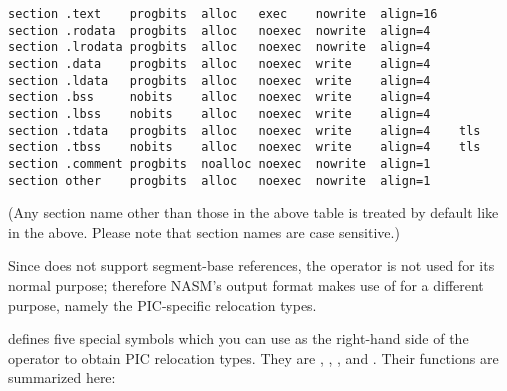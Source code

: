 \begin{lstlisting}
section .text    progbits  alloc   exec    nowrite  align=16
section .rodata  progbits  alloc   noexec  nowrite  align=4
section .lrodata progbits  alloc   noexec  nowrite  align=4
section .data    progbits  alloc   noexec  write    align=4
section .ldata   progbits  alloc   noexec  write    align=4
section .bss     nobits    alloc   noexec  write    align=4
section .lbss    nobits    alloc   noexec  write    align=4
section .tdata   progbits  alloc   noexec  write    align=4    tls
section .tbss    nobits    alloc   noexec  write    align=4    tls
section .comment progbits  noalloc noexec  nowrite  align=1
section other    progbits  alloc   noexec  nowrite  align=1
\end{lstlisting}

(Any section name other than those in the above table is treated by
default like  in the above. Please note that section
names are case sensitive.)


Since  does not support segment-base references, the 
operator is not used for its normal purpose; therefore NASM's 
output format makes use of  for a different purpose, namely the
PIC-specific relocation types.

 defines five special symbols which you can use as the
right-hand side of the  operator to obtain PIC relocation
types. They are , , ,
 and . Their functions are summarized here:

